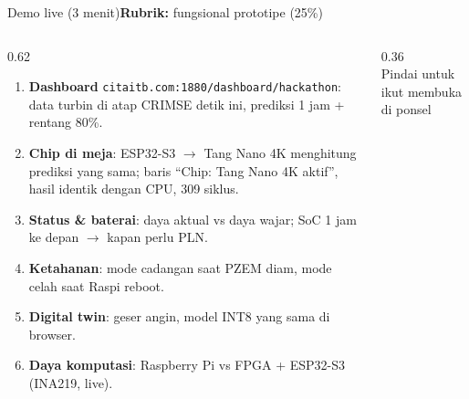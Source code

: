 \documentclass[aspectratio=169, 10pt]{beamer}
\newcommand{\kriteria}[1]{\hfill{\scriptsize\mdseries\color{krem!75}\textbf{Rubrik:} #1}}
\begin{document}
\begin{frame}[label=demo]{Demo live (3 menit)\kriteria{fungsional prototipe (25\%)}}
\begin{columns}[T]
\begin{column}{0.62\linewidth}
\small
\begin{enumerate}
  \item \textbf{Dashboard} \texttt{citaitb.com:1880/dashboard/hackathon}: data turbin di atap CRIMSE detik ini, prediksi 1 jam + rentang 80\%.
  \item \textbf{Chip di meja}: ESP32-S3 $\to$ Tang Nano 4K menghitung prediksi yang sama; baris ``Chip: Tang Nano 4K aktif'', hasil identik dengan CPU, 309 siklus.
  \item \textbf{Status \& baterai}: daya aktual vs daya wajar; SoC 1 jam ke depan $\to$ kapan perlu PLN.
  \item \textbf{Ketahanan}: mode cadangan saat PZEM diam, mode celah saat Raspi reboot.
  \item \textbf{Digital twin}: geser angin, model INT8 yang sama di browser.
  \item \textbf{Daya komputasi}: Raspberry Pi vs FPGA + ESP32-S3 (INA219, live).
\end{enumerate}
\end{column}
\begin{column}{0.36\linewidth}
\centering
{}\\[4pt]
{\scriptsize Pindai untuk ikut membuka di ponsel}\\[8pt]
\end{column}
\end{columns}
\end{frame}
\end{document}
